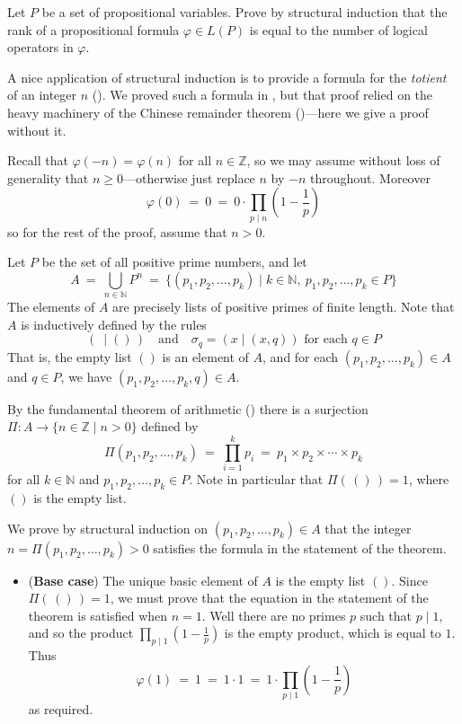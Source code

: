 \begin{exercise}
Let $P$ be a set of propositional variables. Prove by structural induction that the rank of a propositional formula $\varphi \in L(P)$ is equal to the number of logical operators in $\varphi$.
\end{exercise}

A nice application of structural induction is to provide a formula for the \textit{totient} of an integer $n$ (). We proved such a formula in , but that proof relied on the heavy machinery of the Chinese remainder theorem ()---here we give a proof without it.

\rthmTotientFormula*

\begin{cproof}
Recall that $\varphi(-n) = \varphi(n)$ for all $n \in \mathbb{Z}$, so we may assume without loss of generality that $n \ge 0$---otherwise just replace $n$ by $-n$ throughout.
Moreover
\[ \varphi(0) ~=~ 0 ~=~ 0 \cdot \prod_{p \mid n} \left( 1- \frac{1}{p} \right) \]
so for the rest of the proof, assume that $n>0$.

Let $P$ be the set of all positive prime numbers, and let
\[ A ~=~ \bigcup_{n \in \mathbb{N}} P^n ~=~ \{ (p_1,p_2,\dots,p_k) \mid k \in \mathbb{N},~ p_1,p_2,\dots,p_k \in P \} \]
The elements of $A$ are precisely lists of positive primes of finite length. Note that $A$ is inductively defined by the rules
\[ (~ \mid ()\,) \quad \text{and} \quad \sigma_q = (x \mid (x,q)) \text{ for each } q \in P \]
That is, the empty list $()$ is an element of $A$, and for each $(p_1,p_2,\dots,p_k) \in A$ and $q \in P$, we have $(p_1,p_2,\dots,p_k,q) \in A$.

By the fundamental theorem of arithmetic () there is a surjection $\Pi : A \to \{ n \in \mathbb{Z} \mid n > 0 \}$ defined by
\[ \Pi(p_1,p_2,\dots,p_k) ~=~ \prod_{i=1}^k p_i ~=~ p_1 \times p_2 \times \cdots \times p_k \]
for all $k \in \mathbb{N}$ and $p_1,p_2,\dots,p_k \in P$. Note in particular that $\Pi(\,()\,) = 1$, where $()$ is the empty list.

We prove by structural induction on $(p_1,p_2,\dots,p_k) \in A$ that the integer $n = \Pi(p_1,p_2,\dots,p_k) > 0$ satisfies the formula in the statement of the theorem. 

\begin{itemize}
\item (\textbf{Base case}) The unique basic element of $A$ is the empty list $()$. Since $\Pi(\,()\,) = 1$, we must prove that the equation in the statement of the theorem is satisfied when $n=1$. Well there are no primes $p$ such that $p \mid 1$, and so the product $\prod_{p \mid 1} \left( 1 - \frac{1}{p} \right)$ is the empty product, which is equal to $1$. Thus
\[ \varphi(1) ~=~ 1 ~=~ 1 \cdot 1 ~=~ 1 \cdot \prod_{p \mid 1} \left( 1- \frac{1}{p} \right) \]
as required.


\end{itemize}
\end{cproof}
